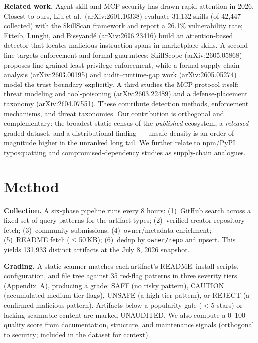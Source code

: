 \documentclass[11pt]{article}
\begin{document}
\textbf{Related work.} Agent-skill and MCP security has drawn rapid attention
in 2026. Closest to ours, Liu et al.\ (arXiv:2601.10338) evaluate 31,132
skills (of 42,447 collected) with the SkillScan framework and report a 26.1\%
vulnerability rate; Etteib, Lunghi, and Bissyand\'e (arXiv:2606.23416) build
an attention-based detector that locates malicious instruction spans in
marketplace skills. A second line targets enforcement and formal guarantees:
SkillScope (arXiv:2605.05868) proposes fine-grained least-privilege
enforcement, while a formal supply-chain analysis (arXiv:2603.00195) and
audit--runtime-gap work (arXiv:2605.05274) model the trust boundary
explicitly. A third studies the MCP protocol itself: threat modeling and
tool-poisoning (arXiv:2603.22489) and a defense-placement taxonomy
(arXiv:2604.07551). These contribute detection methods, enforcement
mechanisms, and threat taxonomies. Our contribution is orthogonal and
complementary: the broadest static census of the \emph{published} ecosystem,
a \emph{released} graded dataset, and a distributional finding --- unsafe
density is an order of magnitude higher in the unranked long tail. We further
relate to npm/PyPI typosquatting and compromised-dependency studies as
supply-chain analogues.

\section{Method}

\textbf{Collection.} A six-phase pipeline runs every 8 hours: (1)~GitHub
search across a fixed set of query patterns for the artifact types;
(2)~verified-creator repository fetch; (3)~community submissions;
(4)~owner/metadata enrichment; (5)~README fetch ($\leq$50\,KB); (6)~dedup by
\texttt{owner/repo} and upsert. This yields 131,933 distinct artifacts at the
July 8, 2026 snapshot.

\textbf{Grading.} A static scanner matches each artifact's README, install
scripts, configuration, and file tree against 35 red-flag patterns in three
severity tiers (Appendix~A), producing a grade: SAFE (no risky pattern),
CAUTION (accumulated medium-tier flags), UNSAFE (a high-tier pattern), or
REJECT (a confirmed-malicious pattern). Artifacts below a popularity gate
($<$5 stars) or lacking scannable content are marked UNAUDITED. We also
compute a 0--100 quality score from documentation, structure, and maintenance
signals (orthogonal to security; included in the dataset for context).
\end{document}
